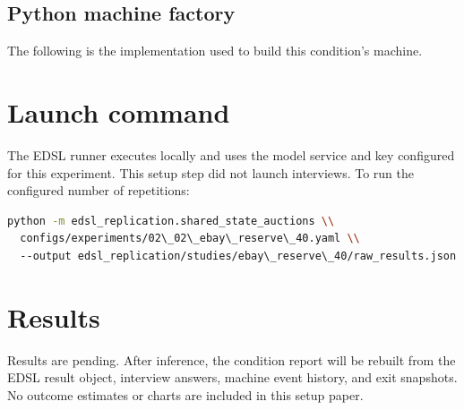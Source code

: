 \documentclass[11pt]{article}
\begin{document}
\subsection{Python machine factory}
The following is the implementation used to build this condition's machine.


\section{Launch command}
The EDSL runner executes locally and uses the model service and key configured
for this experiment. This setup step did not launch interviews. To run the
configured number of repetitions:
\begin{lstlisting}[language=bash]
python -m edsl_replication.shared_state_auctions \\
  configs/experiments/02\_02\_ebay\_reserve\_40.yaml \\
  --output edsl_replication/studies/ebay\_reserve\_40/raw_results.json
\end{lstlisting}
\section{Results}
Results are pending. After inference, the condition report will be rebuilt from
the EDSL result object, interview answers, machine event history, and exit
snapshots. No outcome estimates or charts are included in this setup paper.
\end{document}
